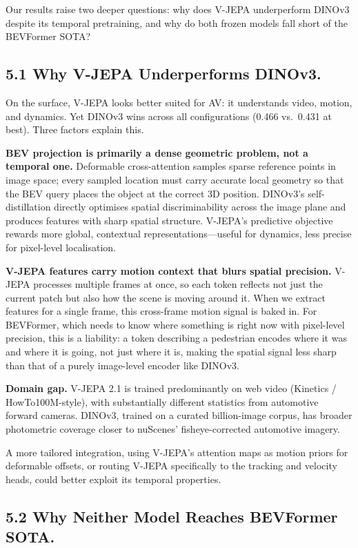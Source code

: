 \documentclass[12pt]{article}
\begin{document}
Our results raise two deeper questions: why does V-JEPA underperform DINOv3 despite its temporal pretraining, and why do both frozen models fall short of the BEVFormer SOTA?

\subsection{5.1 Why V-JEPA Underperforms DINOv3.}
On the surface, V-JEPA looks better suited for AV: it understands video, motion, and dynamics. Yet DINOv3 wins across all configurations (0.466 vs.\ 0.431 at best). Three factors explain this.

\textbf{BEV projection is primarily a dense geometric problem, not a temporal one.} Deformable cross-attention samples sparse reference points in image space; every sampled location must carry accurate local geometry so that the BEV query places the object at the correct 3D position. DINOv3's self-distillation directly optimises spatial discriminability across the image plane and produces features with sharp spatial structure. V-JEPA's predictive objective rewards more global, contextual representations---useful for dynamics, less precise for pixel-level localisation.

\textbf{V-JEPA features carry motion context that blurs spatial precision.} V-JEPA processes multiple frames at once, so each token reflects not just the current patch but also how the scene is moving around it. When we extract features for a single frame, this cross-frame motion signal is baked in. For BEVFormer, which needs to know where something is right now with pixel-level precision, this is a liability: a token describing a pedestrian encodes where it was and where it is going, not just where it is, making the spatial signal less sharp than that of a purely image-level encoder like DINOv3.

\textbf{Domain gap.} V-JEPA 2.1 is trained predominantly on web video (Kinetics / HowTo100M-style), with substantially different statistics from automotive forward cameras. DINOv3, trained on a curated billion-image corpus, has broader photometric coverage closer to nuScenes' fisheye-corrected automotive imagery.

A more tailored integration, using V-JEPA's attention maps as motion priors for deformable offsets, or routing V-JEPA specifically to the tracking and velocity heads, could better exploit its temporal properties.

\subsection{5.2 Why Neither Model Reaches BEVFormer SOTA.}
\end{document}
